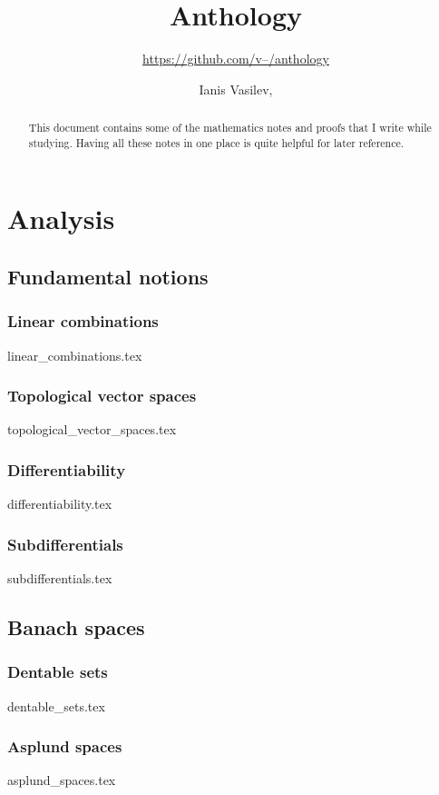 \documentclass[numbers=endperiod, bibliography=totocnumbered]{scrartcl}
\title{Anthology}
\subtitle{\href{https://github.com/v--/anthology}{https://github.com/v--/anthology}}
\author{Ianis Vasilev, \Email{ianis@ivasilev.net}}
\date{}
\begin{document}
\maketitle

\begin{abstract}
  This document contains some of the mathematics notes and proofs that I write while studying. Having all these notes in one place is quite helpful for later reference.
\end{abstract}

\tableofcontents

\section{Analysis}\label{sec:analysis}
\subsection{Fundamental notions}\label{sec:analysis/fundamental_notions}
\subsubsection{Linear combinations}\label{sec:linear_combinations}
{linear_combinations.tex}
\subsubsection{Topological vector spaces}\label{sec:topological_vector_spaces}
{topological_vector_spaces.tex}
\subsubsection{Differentiability}\label{sec:differentiability}
{differentiability.tex}
\subsubsection{Subdifferentials}\label{sec:subdifferentials}
{subdifferentials.tex}

\subsection{Banach spaces}\label{sec:banach_spaces}
\subsubsection{Dentable sets}\label{sec:dentable_sets}
{dentable_sets.tex}
\subsubsection{Asplund spaces}\label{sec:asplund_spaces}
{asplund_spaces.tex}
\end{document}
